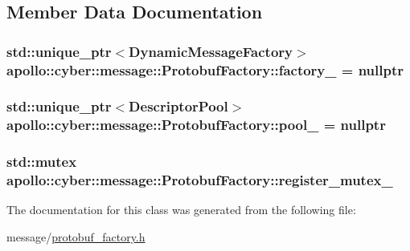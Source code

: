 \subsection{Member Data Documentation}
\hypertarget{classapollo_1_1cyber_1_1message_1_1ProtobufFactory_a2c4114fa07c22295e0e79f00ce02daca}{
\subsubsection[{factory\-\_\-}]{\setlength{\rightskip}{0pt plus 5cm}std\-::unique\-\_\-ptr$<$Dynamic\-Message\-Factory$>$ apollo\-::cyber\-::message\-::\-Protobuf\-Factory\-::factory\-\_\- = nullptr\hspace{0.3cm}{\ttfamily [private]}}}\label{classapollo_1_1cyber_1_1message_1_1ProtobufFactory_a2c4114fa07c22295e0e79f00ce02daca}
\hypertarget{classapollo_1_1cyber_1_1message_1_1ProtobufFactory_ad6c3d990545216334e424c5bb6f00d65}{
\subsubsection[{pool\-\_\-}]{\setlength{\rightskip}{0pt plus 5cm}std\-::unique\-\_\-ptr$<$Descriptor\-Pool$>$ apollo\-::cyber\-::message\-::\-Protobuf\-Factory\-::pool\-\_\- = nullptr\hspace{0.3cm}{\ttfamily [private]}}}\label{classapollo_1_1cyber_1_1message_1_1ProtobufFactory_ad6c3d990545216334e424c5bb6f00d65}
\hypertarget{classapollo_1_1cyber_1_1message_1_1ProtobufFactory_a9acd5bbdb9ef74852b7d89fa6863f109}{
\subsubsection[{register\-\_\-mutex\-\_\-}]{\setlength{\rightskip}{0pt plus 5cm}std\-::mutex apollo\-::cyber\-::message\-::\-Protobuf\-Factory\-::register\-\_\-mutex\-\_\-\hspace{0.3cm}{\ttfamily [private]}}}\label{classapollo_1_1cyber_1_1message_1_1ProtobufFactory_a9acd5bbdb9ef74852b7d89fa6863f109}


The documentation for this class was generated from the following file\-:\begin{DoxyCompactItemize}
\item 
message/\hyperlink{protobuf__factory_8h}{protobuf\-\_\-factory.\-h}\end{DoxyCompactItemize}
